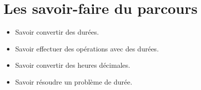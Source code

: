 \documentclass[a4paper,dvipsnames]{article}
\begin{document}
\section{Les savoir-faire du parcours}

\begin{CpsCol}
\begin{itemize}
\item Savoir convertir des durées.
\item Savoir effectuer des opérations avec des durées.
\item Savoir convertir des heures décimales.
\item Savoir résoudre un problème de durée. 
\end{itemize}
\end{CpsCol}
\end{document}
